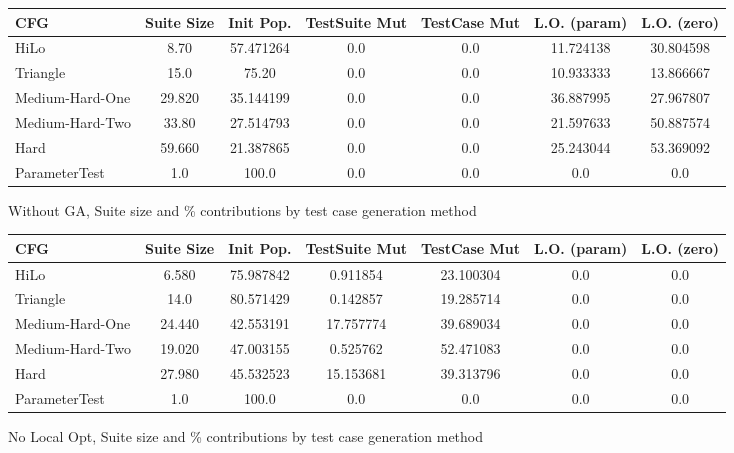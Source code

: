 \documentclass[runningheads]{llncs}
\begin{document}
\begin{figure}[h!]
	\begin{center}
		\begin{tabular}{| l | c || c | c | c | c | c |}
			\hline
			CFG             & Suite Size & Init Pop. & TestSuite Mut & TestCase Mut & L.O. (param)  & L.O. (zero) \\ \hline
			HiLo & 8.70 & 57.471264 & 0.0 & 0.0 & 11.724138 & 30.804598 \\ \hline 
			Triangle & 15.0 & 75.20 & 0.0 & 0.0 & 10.933333 & 13.866667 \\ \hline 
			Medium-Hard-One & 29.820 & 35.144199 & 0.0 & 0.0 & 36.887995 & 27.967807 \\ \hline
			Medium-Hard-Two & 33.80 & 27.514793 & 0.0 & 0.0 & 21.597633 & 50.887574 \\ \hline 
			Hard & 59.660 & 21.387865 & 0.0 & 0.0 & 25.243044 & 53.369092 \\ \hline 
			ParameterTest & 1.0 & 100.0 & 0.0 & 0.0 & 0.0 & 0.0 \\ \hline 
		\end{tabular}
	\end{center}
	\caption{Without GA, Suite size and \% contributions by test case generation method} 
	\label{fig:finalResultNoGAContrib}
\end{figure}

\begin{figure}[h!]
	\begin{center}
		\begin{tabular}{| l | c || c | c | c | c | c |}
			\hline
			CFG             & Suite Size & Init Pop. & TestSuite Mut & TestCase Mut & L.O. (param)  & L.O. (zero) \\ \hline
			HiLo & 6.580 & 75.987842 & 0.911854 & 23.100304 & 0.0 & 0.0 \\ \hline 
			Triangle & 14.0 & 80.571429 & 0.142857 & 19.285714 & 0.0 & 0.0 \\ \hline 
			Medium-Hard-One & 24.440 & 42.553191 & 17.757774 & 39.689034 & 0.0 & 0.0 \\ \hline 
			Medium-Hard-Two & 19.020 & 47.003155 & 0.525762 & 52.471083 & 0.0 & 0.0 \\ \hline 
			Hard & 27.980 & 45.532523 & 15.153681 & 39.313796 & 0.0 & 0.0 \\ \hline 
			ParameterTest & 1.0 & 100.0 & 0.0 & 0.0 & 0.0 & 0.0 \\ \hline
			
		\end{tabular}
	\end{center}
	\caption{No Local Opt, Suite size and \% contributions by test case generation method}
	\label{fig:finalResultNoLOContrib}
\end{figure}
\end{document}
